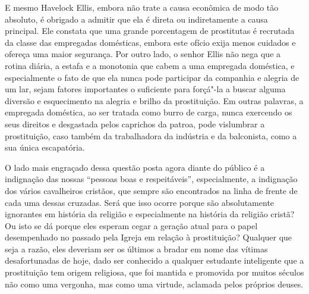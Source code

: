 E mesmo Havelock Ellis, embora não trate a causa econômica de modo tão
absoluto, é obrigado a admitir que ela é direta ou indiretamente a causa
principal. Ele constata que uma grande porcentagem de prostitutas é
recrutada da classe das empregadas domésticas, embora este ofício
exija menos cuidados e ofereça uma maior segurança. Por outro lado, o
senhor Ellis não nega que a rotina diária, a estafa e a monotonia que
cabem a uma empregada doméstica, e especialmente o fato de que ela nunca
pode participar da companhia e alegria de um lar, sejam fatores
importantes o suficiente para forçá"-la a buscar alguma diversão e
esquecimento na alegria e brilho da prostituição. Em outras palavras, a
empregada doméstica, ao ser tratada como burro de carga, nunca exercendo
os seus direitos e desgastada pelos caprichos da patroa, pode vislumbrar
a prostituição, caso também da trabalhadora da indústria e da balconista, como a sua única escapatória.

O lado mais engraçado dessa questão posta agora diante do público é a
indignação das nossas ``pessoas boas e respeitáveis'', especialmente, a
indignação dos vários cavalheiros cristãos, que sempre são encontrados na
linha de frente de cada uma dessas cruzadas. Será que isso ocorre porque são absolutamente ignorantes em história da religião e especialmente
na história da religião cristã? Ou isto se dá porque eles esperam cegar
a geração atual para o papel desempenhado no passado pela Igreja em
relação à prostituição? Qualquer que seja a razão, eles deveriam ser os
últimos a bradar em nome das vítimas desafortunadas de hoje, dado ser
conhecido a qualquer estudante inteligente que a prostituição tem origem
religiosa, que foi mantida e promovida por muitos séculos não como uma
vergonha, mas como uma virtude, aclamada pelos próprios deuses.

